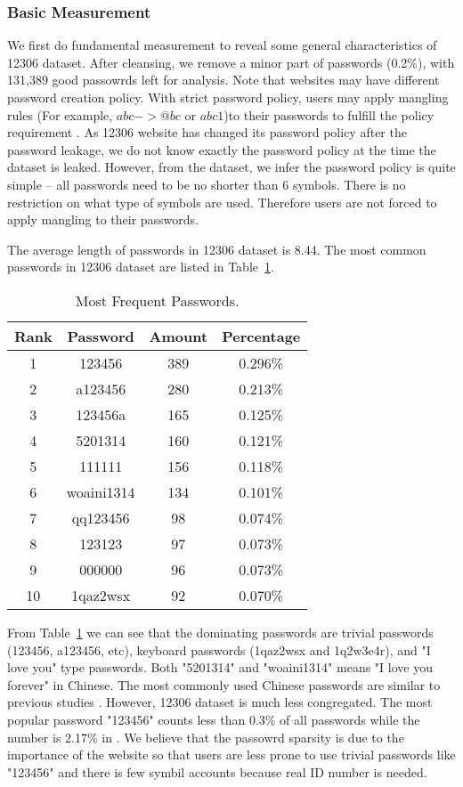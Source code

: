 \subsubsection{Basic Measurement}
We first do fundamental measurement to reveal some general characteristics of 12306 dataset. After cleansing, we remove a minor part of passwords (0.2\%), with 131,389 good passowrds left for analysis. Note that websites may have different password creation policy. With strict password policy, users may apply mangling rules (For example, $abc -> @bc$ or $abc1$)to their passwords to fulfill the policy requirement \cite{weir2010testing}. As 12306 website has changed its password policy after the password leakage, we do not know exactly the password policy at the time the dataset is leaked. However, from the dataset, we infer the password policy is quite simple -- all passwords need to be no shorter than 6 symbols. There is no restriction on what type of symbols are used. Therefore users are not forced to apply mangling to their passwords. 

The average length of passwords in 12306 dataset is 8.44. The most common passwords in 12306 dataset are listed in Table~\ref{t1}.
\begin{table}
\centering
\caption{Most Frequent Passwords.}
\begin{tabular}{|c|c|c|c|} \hline
Rank&Password&Amount&Percentage\\ \hline
1&123456&389&0.296\%\\ 
2&a123456&280&0.213\%\\ 
3&123456a&165&0.125\%\\ 
4&5201314&160&0.121\%\\ 
5&111111&156&0.118\%\\ 
6&woaini1314&134&0.101\%\\ 
7&qq123456&98&0.074\%\\ 
8&123123&97&0.073\%\\ 
9&000000&96&0.073\%\\ 
10&1qaz2wsx&92&0.070\%\\ 
\hline\end{tabular}
\label{t1}
\end{table}

From Table~\ref{t1} we can see that the dominating passwords are trivial passwords (123456, a123456, etc), keyboard passwords (1qaz2wsx and 1q2w3e4r), and "I love you" type passwords. Both "5201314" and "woaini1314" means "I love you forever" in Chinese. The most commonly used Chinese passwords are similar to previous studies \cite{li2014large}. However, 12306 dataset is much less congregated. The most popular password "123456" counts less than 0.3\% of all passwords while the number is 2.17\% in \cite{li2014large}. We believe that the passowrd sparsity is due to the importance of the website so that users are less prone to use trivial passwords like "123456" and there is few symbil accounts because real ID number is needed. 

